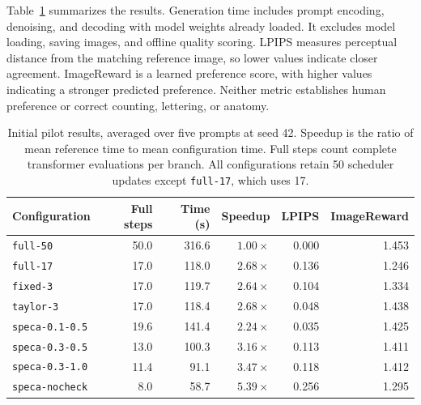 \documentclass[12pt,letterpaper]{article}
\begin{document}
Table~\ref{tab:pilot-results} summarizes the results. Generation time includes prompt encoding, denoising, and decoding with model weights already loaded. It excludes model loading, saving images, and offline quality scoring. LPIPS measures perceptual distance from the matching reference image, so lower values indicate closer agreement. ImageReward is a learned preference score, with higher values indicating a stronger predicted preference. Neither metric establishes human preference or correct counting, lettering, or anatomy.

\begin{table}[p]
\centering
\small
\setlength{\tabcolsep}{4pt}
\begin{tabular}{lrrrrr}
\hline
Configuration & Full steps & Time (s) & Speedup & LPIPS & ImageReward \\
\hline
\texttt{full-50}       & 50.0 & 316.6 & $1.00\times$ & 0.000 & 1.453 \\
\texttt{full-17}       & 17.0 & 118.0 & $2.68\times$ & 0.136 & 1.246 \\
\texttt{fixed-3}       & 17.0 & 119.7 & $2.64\times$ & 0.104 & 1.334 \\
\texttt{taylor-3}      & 17.0 & 118.4 & $2.68\times$ & 0.048 & 1.438 \\
\texttt{speca-0.1-0.5} & 19.6 & 141.4 & $2.24\times$ & 0.035 & 1.425 \\
\texttt{speca-0.3-0.5} & 13.0 & 100.3 & $3.16\times$ & 0.113 & 1.411 \\
\texttt{speca-0.3-1.0} & 11.4 &  91.1 & $3.47\times$ & 0.118 & 1.412 \\
\texttt{speca-nocheck} &  8.0 &  58.7 & $5.39\times$ & 0.256 & 1.295 \\
\hline
\end{tabular}
\caption{Initial pilot results, averaged over five prompts at seed 42. Speedup is the ratio of mean reference time to mean configuration time. Full steps count complete transformer evaluations per branch. All configurations retain 50 scheduler updates except \texttt{full-17}, which uses 17.}
\label{tab:pilot-results}
\end{table}
\end{document}
